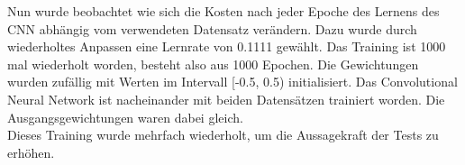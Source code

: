 \documentclass[paper=A4,pagesize=auto,12pt,headinclude=true,footinclude=true,BCOR=0mm,DIV=calc]{scrartcl}
\newcommand{\sectionspace}{
	\vspace{0.5cm}
}
\begin{document}
Nun wurde beobachtet wie sich die Kosten nach jeder Epoche des Lernens des CNN abhängig vom verwendeten Datensatz verändern. Dazu wurde durch wiederholtes Anpassen eine Lernrate von 0.1111 gewählt. Das Training ist 1000 mal wiederholt worden, besteht also aus 1000 Epochen. Die Gewichtungen wurden zufällig mit Werten im Intervall [-0.5, 0.5) initialisiert. Das Convolutional Neural Network ist nacheinander mit beiden Datensätzen trainiert worden. Die Ausgangsgewichtungen waren dabei gleich.\\
Dieses Training wurde mehrfach wiederholt, um die Aussagekraft der Tests zu erhöhen.


\newpage
\sectionspace
\end{document}
